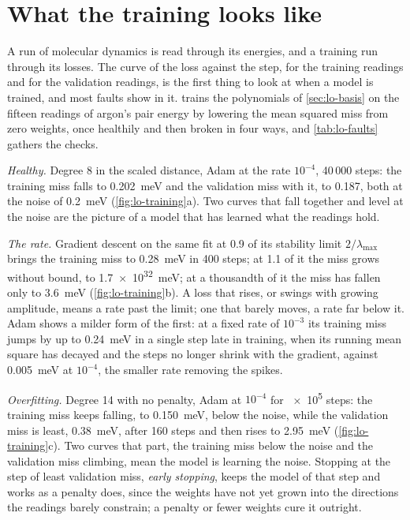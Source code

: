 \section{What the training looks like}
\label{sec:lo-training}

A run of molecular dynamics is read through its energies, and a training
run through its losses. The curve of the loss against the step, for the
training readings and for the validation readings, is the first thing to
look at when a model is trained, and most faults show in it.
 trains the polynomials of \cref{sec:lo-basis} on
the fifteen readings of argon's pair energy by lowering the mean squared
miss from zero weights, once healthily and then broken in four ways, and
\cref{tab:lo-faults} gathers the checks.

\textit{Healthy.} Degree 8 in the scaled distance, Adam at the rate
$10^{-4}$, 40\,000 steps: the training miss falls to
\SI{0.202}{\milli\electronvolt} and the validation miss with it, to
0.187, both at the noise of \SI{0.2}{\milli\electronvolt}
(\cref{fig:lo-training}a). Two curves that fall together and level at the
noise are the picture of a model that has learned what the readings
hold.

\textit{The rate.} Gradient descent on the same fit at 0.9 of its
stability limit $2/\lambda_{\max}$ brings the training miss to
\SI{0.28}{\milli\electronvolt} in 400 steps; at 1.1 of it the miss grows
without bound, to \SI{1.7e32}{\milli\electronvolt}; at a thousandth of
it the miss has fallen only to \SI{3.6}{\milli\electronvolt}
(\cref{fig:lo-training}b). A loss that rises, or swings with growing
amplitude, means a rate past the limit; one that barely moves, a rate far
below it. Adam shows a milder form of the first: at a fixed rate of
$10^{-3}$ its training miss jumps by up to
\SI{0.24}{\milli\electronvolt} in a single step late in training, when
its running mean square has decayed and the steps no longer shrink with
the gradient, against \SI{0.005}{\milli\electronvolt} at $10^{-4}$, the
smaller rate removing the spikes.

\textit{Overfitting.} Degree 14 with no penalty, Adam at $10^{-4}$ for
\num{e5} steps: the training miss keeps falling, to
\SI{0.150}{\milli\electronvolt}, below the noise, while the validation
miss is least, \SI{0.38}{\milli\electronvolt}, after 160 steps and then
rises to \SI{2.95}{\milli\electronvolt} (\cref{fig:lo-training}c). Two
curves that part, the training miss below the noise and the validation
miss climbing, mean the model is learning the noise. Stopping at the
step of least validation miss, \emph{early stopping}, keeps the model of
that step and works as a penalty does, since the weights have not yet
grown into the directions the readings barely constrain; a penalty or
fewer weights cure it outright.

